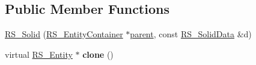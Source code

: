 \subsection*{Public Member Functions}
\begin{DoxyCompactItemize}
\item 
\hyperlink{classRS__Solid_a9aa999eb67ed58f3922a193663e2652e}{R\-S\-\_\-\-Solid} (\hyperlink{classRS__EntityContainer}{R\-S\-\_\-\-Entity\-Container} $\ast$\hyperlink{classRS__Entity_a80358a8d2fc6739a516a278dc500b49f}{parent}, const \hyperlink{classRS__SolidData}{R\-S\-\_\-\-Solid\-Data} \&d)
\item 
\hypertarget{classRS__Solid_a44e24553b00f8e494ce2e8477796fb8a}{virtual \hyperlink{classRS__Entity}{R\-S\-\_\-\-Entity} $\ast$ {\bfseries clone} ()}\label{classRS__Solid_a44e24553b00f8e494ce2e8477796fb8a}


\end{DoxyCompactItemize}
